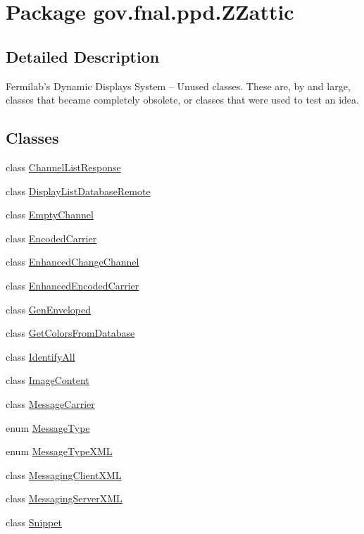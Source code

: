 \hypertarget{namespacegov_1_1fnal_1_1ppd_1_1ZZattic}{\section{Package gov.\-fnal.\-ppd.\-Z\-Zattic}
\label{namespacegov_1_1fnal_1_1ppd_1_1ZZattic}
}


\subsection{Detailed Description}
Fermilab's Dynamic Displays System -- Unused classes. These are, by and large, classes that became completely obsolete, or classes that were used to test an idea. \subsection*{Classes}
\begin{DoxyCompactItemize}
\item 
class \hyperlink{classgov_1_1fnal_1_1ppd_1_1ZZattic_1_1ChannelListResponse}{Channel\-List\-Response}
\item 
class \hyperlink{classgov_1_1fnal_1_1ppd_1_1ZZattic_1_1DisplayListDatabaseRemote}{Display\-List\-Database\-Remote}
\item 
class \hyperlink{classgov_1_1fnal_1_1ppd_1_1ZZattic_1_1EmptyChannel}{Empty\-Channel}
\item 
class \hyperlink{classgov_1_1fnal_1_1ppd_1_1ZZattic_1_1EncodedCarrier}{Encoded\-Carrier}
\item 
class \hyperlink{classgov_1_1fnal_1_1ppd_1_1ZZattic_1_1EnhancedChangeChannel}{Enhanced\-Change\-Channel}
\item 
class \hyperlink{classgov_1_1fnal_1_1ppd_1_1ZZattic_1_1EnhancedEncodedCarrier}{Enhanced\-Encoded\-Carrier}
\item 
class \hyperlink{classgov_1_1fnal_1_1ppd_1_1ZZattic_1_1GenEnveloped}{Gen\-Enveloped}
\item 
class \hyperlink{classgov_1_1fnal_1_1ppd_1_1ZZattic_1_1GetColorsFromDatabase}{Get\-Colors\-From\-Database}
\item 
class \hyperlink{classgov_1_1fnal_1_1ppd_1_1ZZattic_1_1IdentifyAll}{Identify\-All}
\item 
class \hyperlink{classgov_1_1fnal_1_1ppd_1_1ZZattic_1_1ImageContent}{Image\-Content}
\item 
class \hyperlink{classgov_1_1fnal_1_1ppd_1_1ZZattic_1_1MessageCarrier}{Message\-Carrier}
\item 
enum \hyperlink{enumgov_1_1fnal_1_1ppd_1_1ZZattic_1_1MessageType}{Message\-Type}
\item 
enum \hyperlink{enumgov_1_1fnal_1_1ppd_1_1ZZattic_1_1MessageTypeXML}{Message\-Type\-X\-M\-L}
\item 
class \hyperlink{classgov_1_1fnal_1_1ppd_1_1ZZattic_1_1MessagingClientXML}{Messaging\-Client\-X\-M\-L}
\item 
class \hyperlink{classgov_1_1fnal_1_1ppd_1_1ZZattic_1_1MessagingServerXML}{Messaging\-Server\-X\-M\-L}
\item 
class \hyperlink{classgov_1_1fnal_1_1ppd_1_1ZZattic_1_1Snippet}{Snippet}
\end{DoxyCompactItemize}
